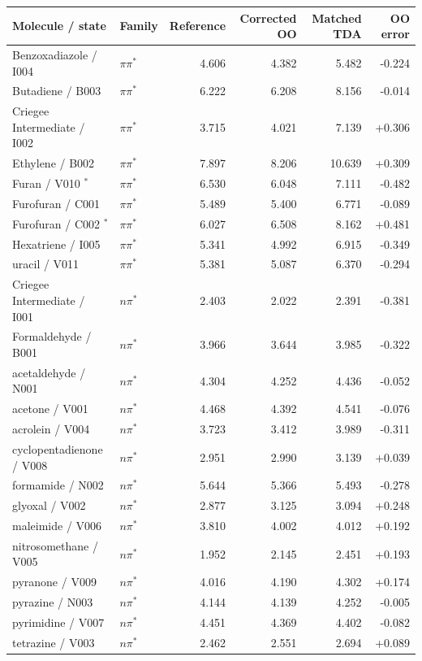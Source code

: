 \begin{longtable}{llrrrr}
\toprule Molecule / state & Family & Reference & Corrected OO & Matched TDA & OO error\\\midrule\endhead
Benzoxadiazole / I004 & $\pi\pi^*$ & 4.606 & 4.382 & 5.482 & -0.224\\
Butadiene / B003 & $\pi\pi^*$ & 6.222 & 6.208 & 8.156 & -0.014\\
Criegee Intermediate / I002 & $\pi\pi^*$ & 3.715 & 4.021 & 7.139 & +0.306\\
Ethylene / B002 & $\pi\pi^*$ & 7.897 & 8.206 & 10.639 & +0.309\\
Furan / V010 $^*$ & $\pi\pi^*$ & 6.530 & 6.048 & 7.111 & -0.482\\
Furofuran / C001 & $\pi\pi^*$ & 5.489 & 5.400 & 6.771 & -0.089\\
Furofuran / C002 $^*$ & $\pi\pi^*$ & 6.027 & 6.508 & 8.162 & +0.481\\
Hexatriene / I005 & $\pi\pi^*$ & 5.341 & 4.992 & 6.915 & -0.349\\
uracil / V011 & $\pi\pi^*$ & 5.381 & 5.087 & 6.370 & -0.294\\
Criegee Intermediate / I001 & $n\pi^*$ & 2.403 & 2.022 & 2.391 & -0.381\\
Formaldehyde / B001 & $n\pi^*$ & 3.966 & 3.644 & 3.985 & -0.322\\
acetaldehyde / N001 & $n\pi^*$ & 4.304 & 4.252 & 4.436 & -0.052\\
acetone / V001 & $n\pi^*$ & 4.468 & 4.392 & 4.541 & -0.076\\
acrolein / V004 & $n\pi^*$ & 3.723 & 3.412 & 3.989 & -0.311\\
cyclopentadienone / V008 & $n\pi^*$ & 2.951 & 2.990 & 3.139 & +0.039\\
formamide / N002 & $n\pi^*$ & 5.644 & 5.366 & 5.493 & -0.278\\
glyoxal / V002 & $n\pi^*$ & 2.877 & 3.125 & 3.094 & +0.248\\
maleimide / V006 & $n\pi^*$ & 3.810 & 4.002 & 4.012 & +0.192\\
nitrosomethane / V005 & $n\pi^*$ & 1.952 & 2.145 & 2.451 & +0.193\\
pyranone / V009 & $n\pi^*$ & 4.016 & 4.190 & 4.302 & +0.174\\
pyrazine / N003 & $n\pi^*$ & 4.144 & 4.139 & 4.252 & -0.005\\
pyrimidine / V007 & $n\pi^*$ & 4.451 & 4.369 & 4.402 & -0.082\\
tetrazine / V003 & $n\pi^*$ & 2.462 & 2.551 & 2.694 & +0.089\\
\bottomrule\end{longtable}
